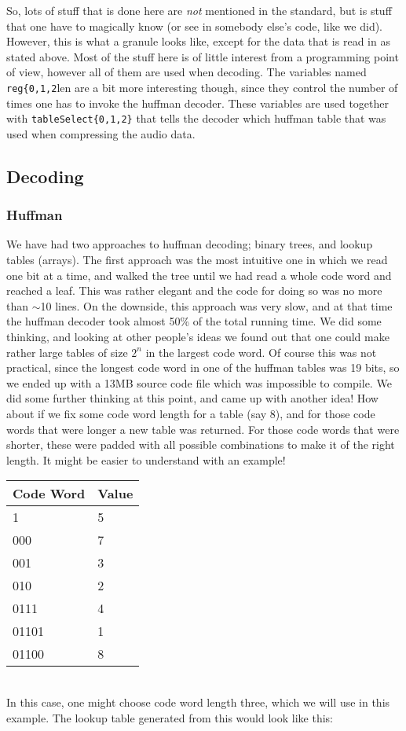 \documentclass[a4paper,12pt]{article}
\begin{document}
    So, lots of stuff that is done here are \textit{not} mentioned in the
    standard, but is stuff that one have to magically know (or see in somebody
    else's code, like we did). However, this is what a granule looks like,
    except for the data that is read in as stated above. Most of the stuff here
    is of little interest from a programming point of view, however all of them
    are used when decoding. The variables named \texttt{reg\{0,1,2}len are a bit
    more interesting though, since they control the number of times one has to
    invoke the huffman decoder. These variables are used together with
    \texttt{tableSelect\{0,1,2\}} that tells the decoder which huffman table
    that was used when compressing the audio data. 

    \subsection{Decoding}
    \subsubsection{Huffman}
    We have had two approaches to huffman decoding; binary trees, and lookup
    tables (arrays). The first approach was the most intuitive one in which we
    read one bit at a time, and walked the tree until we had read a whole code
    word and reached a leaf. This was rather elegant and the code for doing so
    was no more than $\sim$10 lines. On the downside, this approach was very
    slow, and at that time the huffman decoder took almost 50\% of the total
    running time. We did some thinking, and looking at other people's ideas we
    found out that one could make rather large tables of size $2^n$ in the
    largest code word. Of course this was not practical, since the longest code
    word in one of the huffman tables was 19 bits, so we ended up with a 13MB
    source code file which was impossible to compile. We did some further
    thinking at this point, and came up with another idea! How about if we fix
    some code word length for a table (say 8), and for those code words that
    were longer a new table was returned. For those code words that were
    shorter, these were padded with all possible combinations to make it of the
    right length. It might be easier to understand with an example!

    \begin{tabular}{| l | l |}
        \hline
        Code Word & Value \\ \hline \hline
        1   & 5 \\ 
        000 & 7 \\
        001 & 3 \\
        010 & 2 \\
        0111  & 4 \\ 
        01101 & 1 \\ 
        01100 & 8 \\ \hline
    \end{tabular} \\
    In this case, one might choose code word length three, which we will use in
    this example. The lookup table generated from this would look like this:
    
\end{document}
